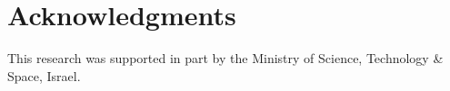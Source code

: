 \documentclass[letterpaper]{article} %
\begin{document}










\section{Acknowledgments}
This research was supported in part by the Ministry of Science, Technology \& Space, Israel.

%

\end{document}
